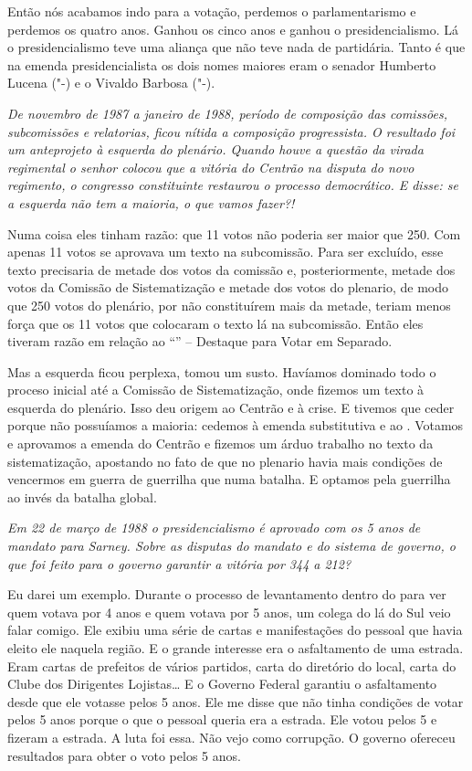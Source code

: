 Então nós acabamos indo para a votação, perdemos o parlamentarismo e
perdemos os quatro anos. Ganhou os cinco anos e ganhou o
presidencialismo. Lá o presidencialismo teve uma aliança que não teve
nada de partidária. Tanto é que na emenda presidencialista os dois nomes
maiores eram o senador Humberto Lucena ("-) e o Vivaldo Barbosa
("-).

\medskip

\emph{De novembro de 1987 a janeiro de 1988, período de composição das
comissões, subcomissões e relatorias, ficou nítida a composição
progressista. O resultado foi um anteprojeto à esquerda do plenário.
Quando houve a questão da virada regimental o senhor colocou que a
vitória do Centrão na disputa do novo regimento, o congresso
constituinte restaurou o processo democrático. E disse: se a esquerda
não tem a maioria, o que vamos fazer?!}

Numa coisa eles tinham razão: que 11 votos não poderia
ser maior que 250. Com apenas 11 votos se aprovava um texto na
subcomissão. Para ser excluído, esse texto precisaria de metade dos
votos da comissão e, posteriormente, metade dos votos da Comissão de
Sistematização e metade dos votos do plenario, de modo que 250 votos do
plenário, por não constituírem mais da metade, teriam menos força que os
11 votos que colocaram o texto lá na subcomissão. Então eles tiveram
razão em relação ao ``'' -- Destaque para Votar em Separado.

Mas a esquerda ficou perplexa, tomou um susto. Havíamos dominado todo o
proceso inicial até a Comissão de Sistematização, onde fizemos um texto
à esquerda do plenário. Isso deu origem ao Centrão e à crise. E tivemos
que ceder porque não possuíamos a maioria: cedemos à emenda substitutiva
e ao . Votamos e aprovamos a emenda do Centrão e fizemos um árduo
trabalho no texto da sistematização, apostando no fato de que no
plenario havia mais condições de vencermos em guerra de guerrilha que
numa batalha. E optamos pela guerrilha ao invés da batalha global.

\medskip

\emph{Em 22 de março de 1988 o presidencialismo é aprovado com os 5 anos de
mandato para Sarney. Sobre as disputas do mandato e do sistema de
governo, o que foi feito para o governo garantir a vitória por 344 a
212?}

Eu darei um exemplo. Durante o processo de levantamento
dentro do  para ver quem votava por 4 anos e quem votava por 5 anos,
um colega do  lá do Sul veio falar comigo. Ele exibiu uma série de
cartas e manifestações do pessoal que havia eleito ele naquela região. E
o grande interesse era o asfaltamento de uma estrada. Eram cartas de
prefeitos de vários partidos, carta do diretório do  local, carta do
Clube dos Dirigentes Lojistas\ldots{} E o Governo Federal garantiu o
asfaltamento desde que ele votasse pelos 5 anos. Ele me disse que não
tinha condições de votar pelos 5 anos porque o que o pessoal queria era
a estrada. Ele votou pelos 5 e fizeram a estrada. A luta foi essa. Não
vejo como corrupção. O governo ofereceu resultados para obter o voto
pelos 5 anos.

